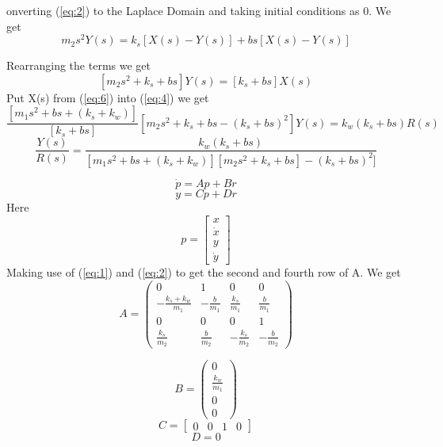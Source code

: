 \documentclass{article}
\newenvironment{answer}[2][Answer]{\begin{trivlist}
  \item[\hskip \labelsep {\bfseries #1}\hskip \labelsep {\bfseries #2:}]}{\end{trivlist}}
\begin{document}
\begin{answer}
  Converting (\ref{eq:2}) to the Laplace Domain and taking initial conditions as 0. We get
  \begin{equation}
    \label{eq:5}
    m_2s^2 Y(s) = k_s[X(s) - Y(s)] + bs[X(s) - Y(s)]
  \end{equation}
  
  Rearranging the terms we get
  \begin{equation}
    \label{eq:6}
    [m_2s^2 + k_s + bs]Y(s) = [k_s + bs]X(s)
  \end{equation}
  Put X(s) from (\ref{eq:6}) into (\ref{eq:4}) we get
  $$\frac{[m_1s^2 + bs + (k_s + k_w)]}{[k_s + bs]}[m_2s^2 + k_s + bs - (k_s + bs)^2]Y(s) = k_w(k_s+ bs)R(s)$$
  $$\frac{Y(s)}{R(s)} = \frac{ k_w(k_s+ bs)}{[m_1s^2 + bs + (k_s + k_w)][m_2s^2 + k_s + bs] - (k_s + bs)^2]}$$
\end{answer}

\begin{answer}b
  $$\dot{p} = Ap + Br$$
  $$y = Cp + Dr$$
  Here
  \[
    p = \begin{bmatrix}
      x \\
      \dot{x}\\
      y\\
      \dot{y}
    \end{bmatrix}
  \]
  Making use of (\ref{eq:1}) and (\ref{eq:2}) to get the second and fourth row of A. We get
  $$A = \left(\begin{array}{cccc} 0 & 1 & 0 & 0\\ -\frac{k_{s} + k_{w}}{m_{1}} & -\frac{b}{m_{1}} & \frac{k_{s}}{m_{1}} & \frac{b}{m_{1}}\\ 0 & 0 & 0 & 1\\ \frac{k_{s}}{m_{2}} & \frac{b}{m_{2}} & -\frac{k_{s}}{m_{2}} & -\frac{b}{m_{2}} \end{array}\right)$$
  
  $$B = \left(\begin{array}{c} 0\\ \frac{k_{w}}{m_{1}}\\ 0\\ 0 \end{array}\right)$$
  \[
    C =
    \begin{bmatrix}
      0 & 0 & 1 & 0
    \end{bmatrix}
  \]
  $$ D = 0$$
\end{answer}
\end{document}

